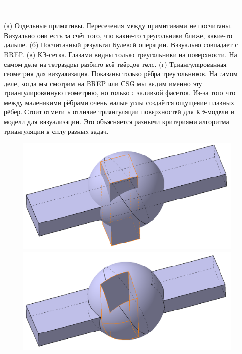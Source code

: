 \section{---------------------------------------}


(а) Отдельные примитивы. Пересечения между примитивами не посчитаны. Визуально они есть за счёт того, что какие-то треугольники ближе, какие-то дальше.
(б) Посчитанный результат Булевой операции. Визуально совпадает с BREP.
(в) КЭ-сетка. Глазами видны только треугольники на поверхности. На самом деле на тетраэдры разбито всё твёрдое тело.
(г) Триангулированная геометрия для визуализация. Показаны только рёбра треугольников. На самом деле, когда мы смотрим на BREP или СSG мы видим именно эту триангулированную геометрию, но только с заливкой фасеток. Из-за того что между маленикими рёбрами очень малые углы создаётся ощущение плавных рёбер. Стоит отметить отличие триангуляции поверхностей для КЭ-модели и модели для визуализации. Это объясняется разными критериями алгоритма триангуляции в силу разных задач.

\begin{figure}[H]
\begin{minipage}[b]{0.495\textwidth}
\includegraphics[width=1.0\textwidth]{pictures/Separate_primitives.png}
\end{minipage}
\hspace{0.01\textwidth}
\begin{minipage}[b]{0.495\textwidth}
\includegraphics[width=1.0\textwidth]{pictures/BREP_2.png}
\end{minipage}
\caption{}
\label{fig:DiffGeoRepr1}
\end{figure}

